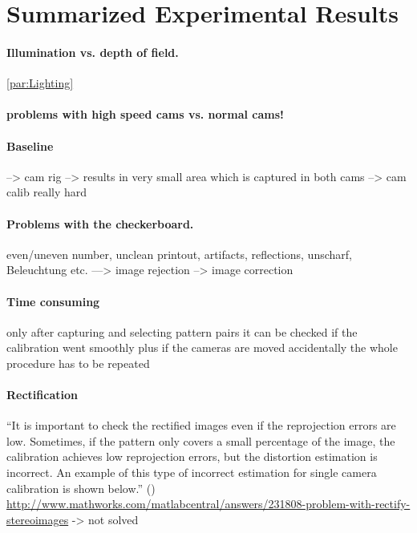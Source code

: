 \section{Summarized Experimental Results}\label{sec:ExperimentalResults}

\paragraph{Illumination vs. depth of field.}
\autoref{par:Lighting}

\paragraph{problems with high speed cams vs. normal cams!}

\paragraph{Baseline}
--> cam rig
--> results in very small area which is captured in both cams --> cam calib really hard

\paragraph{Problems with the checkerboard.}
even/uneven number, unclean printout, artifacts, reflections, unscharf, Beleuchtung etc. ---> image rejection
--> image correction

\paragraph{Time consuming}
only after capturing and selecting pattern pairs it can be checked if the calibration went smoothly
plus if the cameras are moved accidentally the whole procedure has to be repeated

\paragraph{Rectification}

\enquote{It is important to check the rectified images even if the reprojection errors are low. Sometimes, if the pattern only covers a small percentage of the image, the calibration achieves low reprojection errors, but the distortion estimation is incorrect. An example of this type of incorrect estimation for single camera calibration is shown below.} (\cite{StereoCalib.2016})
\url{http://www.mathworks.com/matlabcentral/answers/231808-problem-with-rectify-stereoimages}
-> not solved

